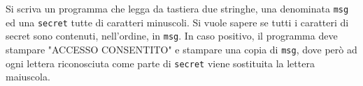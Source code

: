 \begin{Exercise}[label={ex:secret}]
    Si scriva un programma che legga da tastiera due stringhe, una denominata \texttt{msg} ed una \texttt{secret} tutte di caratteri minuscoli.
    Si vuole sapere se tutti i caratteri di secret sono contenuti, nell'ordine, in \texttt{msg}.
    In caso positivo, il programma deve stampare "ACCESSO CONSENTITO" e stampare una copia di \texttt{msg}, dove però ad ogni lettera riconosciuta come parte di \texttt{secret} viene
    sostituita la lettera maiuscola.
\end{Exercise}

\begin{Answer}[ref={ex:secret}]
    
\end{Answer}
